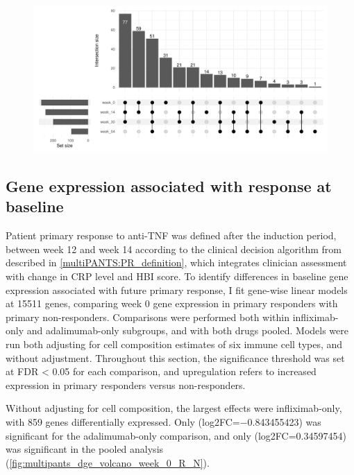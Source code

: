 \begin{outline}
\begin{figure}
    \centering
    \includegraphics[width=1.0\textwidth,page=1]{mainmatter/figures/chapter_04/process_pheno.pheno_filtered_dge.Visit_Label_upset.pdf}
    \caption{}
    \label{fig:multipants_visits_upset}
\end{figure}



\subsection{Gene expression associated with response at baseline}


Patient primary response to anti-\gls{TNF} was defined after the induction period, between week 12 and week 14 according to the clinical decision algorithm from \textcite{kennedy2019PredictorsAntiTNFTreatment} described in \autoref{multiPANTS:PR_definition}, 
which integrates clinician assessment with change in \gls{CRP} level and \gls{HBI} score.
To identify differences in baseline gene expression associated with future primary response, 
I fit gene-wise linear models at 15511 genes, comparing week 0 gene expression in primary responders with primary non-responders.
Comparisons were performed both within infliximab-only and adalimumab-only subgroups, and with both drugs pooled.
Models were run both adjusting for cell composition estimates of six immune cell types, and without adjustment.
Throughout this section, the significance threshold was set at FDR < 0.05 for each comparison, and upregulation refers to increased expression in primary responders versus non-responders.

Without adjusting for cell composition, the largest effects were infliximab-only, with 859 genes differentially expressed.
Only  (log2FC=\num{-0.843455423}) was significant for the adalimumab-only comparison, 
and only  (log2FC=\num{0.34597454}) was significant in the pooled analysis (\autoref{fig:multipants_dge_volcano_week_0_R_N}).


\end{outline}
